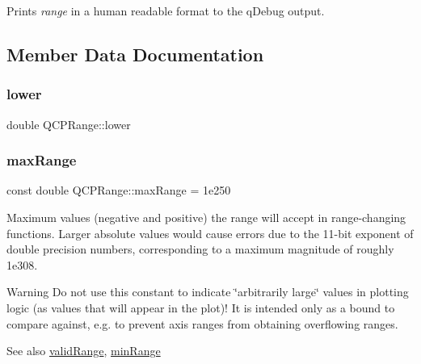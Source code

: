 Prints {\itshape range} in a human readable format to the q\+Debug output. 

\subsection{Member Data Documentation}
\mbox{\label{class_q_c_p_range_aa3aca3edb14f7ca0c85d912647b91745}} 
\subsubsection{\texorpdfstring{lower}{lower}}
{\footnotesize\ttfamily double Q\+C\+P\+Range\+::lower}

\mbox{\label{class_q_c_p_range_a5ca51e7a2dc5dc0d49527ab171fe1f4f}} 
\subsubsection{\texorpdfstring{maxRange}{maxRange}}
{\footnotesize\ttfamily const double Q\+C\+P\+Range\+::max\+Range = 1e250\hspace{0.3cm}{\ttfamily [static]}}

Maximum values (negative and positive) the range will accept in range-\/changing functions. Larger absolute values would cause errors due to the 11-\/bit exponent of double precision numbers, corresponding to a maximum magnitude of roughly 1e308.

\begin{DoxyWarning}{Warning}
Do not use this constant to indicate \char`\"{}arbitrarily large\char`\"{} values in plotting logic (as values that will appear in the plot)! It is intended only as a bound to compare against, e.\+g. to prevent axis ranges from obtaining overflowing ranges.
\end{DoxyWarning}
\begin{DoxySeeAlso}{See also}
\mbox{\hyperlink{class_q_c_p_range_ab38bd4841c77c7bb86c9eea0f142dcc0}{valid\+Range}}, \mbox{\hyperlink{class_q_c_p_range_ab46d3bc95030ee25efda41b89e2b616b}{min\+Range}} 
\end{DoxySeeAlso}
\mbox{\label{class_q_c_p_range_ab46d3bc95030ee25efda41b89e2b616b}} 
